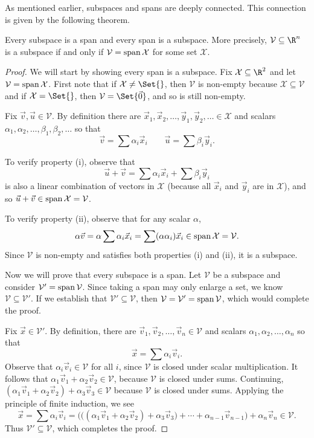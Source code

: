 As mentioned earlier, subspaces and spans are deeply connected.
This connection is given by the following theorem.

\begin{theorem}
	Every subspace is a span and every span is a subspace.  More precisely,
	$\mathcal V\subseteq \R^n$ is a subspace if and only if $\mathcal V=
	\operatorname{span}\mathcal X$ for some set $\mathcal X$.
\end{theorem}
\begin{proof}
	We will start by showing every span is a subspace.  Fix $\mathcal X\subseteq\R^2$
	and let
	$\mathcal V=\operatorname{span}\mathcal X$. First note that if $\mathcal X\neq \Set{}$, then $\mathcal V$
	is non-empty because $\mathcal X\subseteq\mathcal V$ and if $\mathcal X=\Set{}$, then $\mathcal V=\Set{\vec 0}$,
	and so is still non-empty.
	
	Fix $\vec v,\vec u\in\mathcal V$. By definition there are $\vec x_1,\vec x_2,\ldots,\vec y_1,\vec y_2,\ldots\in\mathcal X$ 
	and scalars $\alpha_1,\alpha_2,\ldots,\beta_1,\beta_2,\ldots$ so that
	\[
		\vec v=\sum \alpha_i\vec x_i\qquad \vec u=\sum\beta_i\vec y_i.
	\]

	To verify property (i), observe that
	\[
		\vec u+\vec v=\sum\alpha_i\vec x_i + \sum\beta_i\vec y_i
	\]
	is also a linear combination of vectors in $\mathcal X$ (because all $\vec x_i$ and $\vec y_i$
	are in $\mathcal X$), and so $\vec u+\vec v\in	\operatorname{span}\mathcal X=\mathcal V$.
	
	To verify property (ii), observe that for any scalar $\alpha$, 
	\[
		\alpha\vec v=\alpha\sum \alpha_i\vec x_i = \sum (\alpha\alpha_i)\vec x_i\in
		\operatorname{span}\mathcal X=\mathcal V.
	\]
	Since $\mathcal V$ is non-empty and satisfies both properties (i) and (ii), it is a subspace.

	Now we will prove that every subspace is a span. Let $\mathcal V$ be a subspace
	and consider $\mathcal V'=\operatorname{span}\mathcal V$.  Since taking a span may only enlarge a set, we know
	$\mathcal V\subseteq \mathcal V'$. If we establish that $\mathcal V'\subseteq\mathcal V$,
	then $\mathcal V=\mathcal V'=\operatorname{span}\mathcal V$, which would complete the proof.

	Fix $\vec x\in\mathcal V'$. By definition, there are $\vec v_1,\vec v_2,\ldots,\vec v_n\in\mathcal V$ and scalars
	$\alpha_1,\alpha_2,\ldots,\alpha_n$ so that
	\[
		\vec x=\sum \alpha_i\vec v_i.
	\]
	Observe that 
	$\alpha_i\vec v_i\in\mathcal V$ for all $i$, since $\mathcal V$ is closed under scalar
	multiplication. It follows that $\alpha_1\vec v_1+\alpha_2\vec v_2\in\mathcal V$,
	because $\mathcal V$ is closed under sums. Continuing, 
	$(\alpha_1\vec v_1+\alpha_2\vec v_2)+\alpha_3\vec v_3\in\mathcal V$ because
	$\mathcal V$ is closed under sums. Applying the principle of finite induction, we see
	\[
		\vec x=\sum \alpha_i\vec v_i
		=\Big(\big((\alpha_1\vec v_1+\alpha_2\vec v_2)
		+\alpha_3\vec v_3\big)+\cdots+\alpha_{n-1}\vec v_{n-1} \Big)
		+\alpha_n\vec v_n\in\mathcal V.
	\]
	Thus $\mathcal V'\subseteq\mathcal V$, which completes the proof.
\end{proof}

